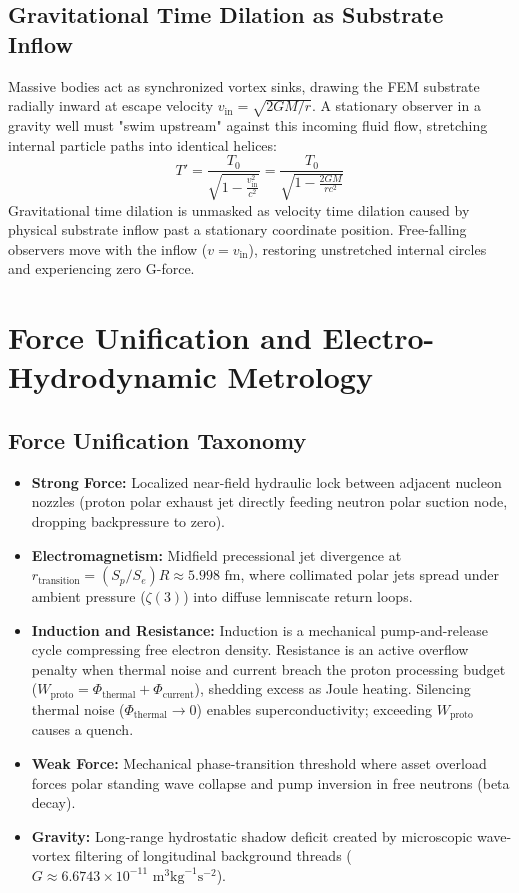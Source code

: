 \documentclass[11pt,a4paper]{article}
\begin{document}
	\subsection{Gravitational Time Dilation as Substrate Inflow}
	Massive bodies act as synchronized vortex sinks, drawing the FEM substrate radially inward at escape velocity $v_{\text{in}} = \sqrt{2GM/r}$. A stationary observer in a gravity well must "swim upstream" against this incoming fluid flow, stretching internal particle paths into identical helices:
	\begin{equation}
		T' = \frac{T_0}{\sqrt{1 - \frac{v_{\text{in}}^2}{c^2}}} = \frac{T_0}{\sqrt{1 - \frac{2GM}{rc^2}}}
	\end{equation}
	Gravitational time dilation is unmasked as velocity time dilation caused by physical substrate inflow past a stationary coordinate position. Free-falling observers move with the inflow ($v = v_{\text{in}}$), restoring unstretched internal circles and experiencing zero G-force.
	
	\section{Force Unification and Electro-Hydrodynamic Metrology}
	
	\subsection{Force Unification Taxonomy}
	\begin{itemize}
		\item \textbf{Strong Force:} Localized near-field hydraulic lock between adjacent nucleon nozzles (proton polar exhaust jet directly feeding neutron polar suction node, dropping backpressure to zero).
		\item \textbf{Electromagnetism:} Midfield precessional jet divergence at $r_{\text{transition}} = (S_p/S_e)R \approx 5.998\text{ fm}$, where collimated polar jets spread under ambient pressure ($\zeta(3)$) into diffuse lemniscate return loops.
		\item \textbf{Induction and Resistance:} Induction is a mechanical pump-and-release cycle compressing free electron density. Resistance is an active overflow penalty when thermal noise and current breach the proton processing budget ($W_{\text{proto}} = \Phi_{\text{thermal}} + \Phi_{\text{current}}$), shedding excess as Joule heating. Silencing thermal noise ($\Phi_{\text{thermal}} \to 0$) enables superconductivity; exceeding $W_{\text{proto}}$ causes a quench.
		\item \textbf{Weak Force:} Mechanical phase-transition threshold where asset overload forces polar standing wave collapse and pump inversion in free neutrons (beta decay).
		\item \textbf{Gravity:} Long-range hydrostatic shadow deficit created by microscopic wave-vortex filtering of longitudinal background threads ($G \approx 6.6743 \times 10^{-11}\text{ m}^3\text{kg}^{-1}\text{s}^{-2}$).
	\end{itemize}
	
\end{document}

